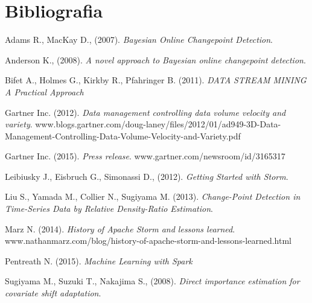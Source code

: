 \chapter*{Bibliografia}

\begin{references}

\item
Adams R., MacKay D., (2007).
\textit{Bayesian Online Changepoint Detection}.

\item
Anderson K., (2008).
\textit{A novel approach to Bayesian online changepoint detection}.

\item
Bifet A., Holmes G., Kirkby R., Pfahringer B. (2011).
\textit{DATA STREAM MINING A Practical Approach}

\item
Gartner Inc. (2012).
\textit{Data management controlling data volume velocity and variety}.
www.blogs.gartner.com/doug-laney/files/2012/01/ad949-3D-Data-Management-Controlling-Data-Volume-Velocity-and-Variety.pdf

\item
Gartner Inc. (2015).
\textit{Press release}.
www.gartner.com/newsroom/id/3165317

\item
Leibiusky J., Eisbruch G., Simonassi D., (2012).
\textit{Getting Started with Storm}.


\item
Liu S., Yamada M., Collier N., Sugiyama M. (2013).
\textit{Change-Point Detection in Time-Series Data by Relative Density-Ratio Estimation}.

\item
Marz N. (2014).
\textit{History of Apache Storm and lessons learned}.
www.nathanmarz.com/blog/history-of-apache-storm-and-lessons-learned.html

\item
Pentreath N. (2015).
\textit{Machine Learning with Spark}

\item
Sugiyama M., Suzuki T., Nakajima S., (2008).
\textit{Direct importance estimation for covariate shift adaptation}.

\end{references}

